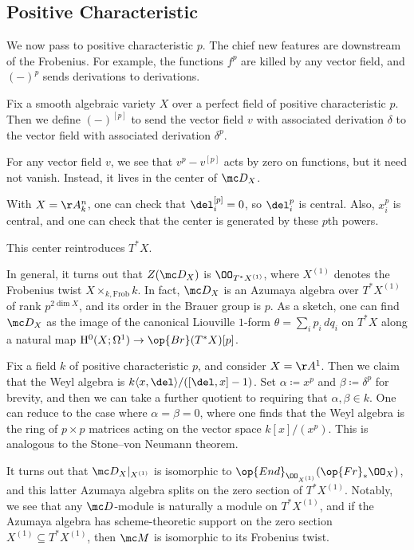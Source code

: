 \documentclass[../notes.tex]{subfiles}
\begin{document}
\subsection{Positive Characteristic}
We now pass to positive characteristic $p$. The chief new features are downstream of the Frobenius. For example, the functions $f^p$ are killed by any vector field, and $(-)^p$ sends derivations to derivations.
\begin{notation}
	Fix a smooth algebraic variety $X$ over a perfect field of positive characteristic $p$. Then we define $(-)^{[p]}$ to send the vector field $v$ with associated derivation $\delta$ to the vector field with associated derivation $\delta^p$.
\end{notation}
\begin{remark}
	For any vector field $v$, we see that $v^p-v^{[p]}$ acts by zero on functions, but it need not vanish. Instead, it lives in the center of $\mc D_X$.
\end{remark}
\begin{example}
	With $X=\AA^n_k$, one can check that $\del_i^{[p]}=0$, so $\del_i^p$ is central. Also, $x_i^p$ is central, and one can check that the center is generated by these $p$th powers.
\end{example}
This center reintroduces $T^*X$.
\begin{remark}
	In general, it turns out that $Z(\mc D_X)$ is $\OO_{T^*X^{(1)}}$, where $X^{(1)}$ denotes the Frobenius twist $X\times_{k,\mathrm{Frob}}k$. In fact, $\mc D_X$ is an Azumaya algebra over $T^*X^{(1)}$ of rank $p^{2\dim X}$, and its order in the Brauer group is $p$. As a sketch, one can find $\mc D_X$ as the image of the canonical Liouville $1$-form $\theta=\sum_ip_i\,dq_i$ on $T^*X$ along a natural map $\mathrm H^0(X;\Omega^1)\to\op{Br}(T^*X)[p]$.
\end{remark}
\begin{example}
	Fix a field $k$ of positive characteristic $p$, and consider $X=\AA^1$. Then we claim that the Weyl algebra is $k\langle x,\del\rangle/([\del,x]-1)$. Set $\alpha\coloneqq x^p$ and $\beta\coloneqq\delta^p$ for brevity, and then we can take a further quotient to requiring that $\alpha,\beta\in k$. One can reduce to the case where $\alpha=\beta=0$, where one finds that the Weyl algebra is the ring of $p\times p$ matrices acting on the vector space $k[x]/\left(x^p\right)$. This is analogous to the Stone--von Neumann theorem.
\end{example}
\begin{remark}
	It turns out that $\mc D_X|_{X^{(1)}}$ is isomorphic to $\op{End}_{\OO_{X^{(1)}}}(\op{Fr}_*\OO_X)$, and this latter Azumaya algebra splits on the zero section of $T^*X^{(1)}$. Notably, we see that any $\mc D$-module is naturally a module on $T^*X^{(1)}$, and if the Azumaya algebra has scheme-theoretic support on the zero section $X^{(1)}\subseteq T^*X^{(1)}$, then $\mc M$ is isomorphic to its Frobenius twist.
\end{remark}
\end{document}
